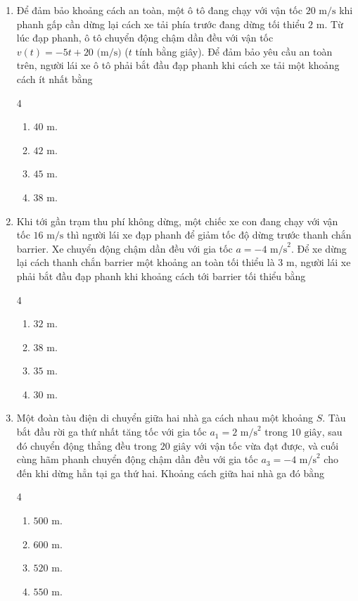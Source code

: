 \documentclass[12pt]{article}
\begin{document}
\begin{enumerate}[label=\textbf{Câu \arabic*.}]
		\item Để đảm bảo khoảng cách an toàn, một ô tô đang chạy với vận tốc $20\text{ m/s}$ khi phanh gấp cần dừng lại cách xe tải phía trước đang dừng tối thiểu $2\text{ m}$. Từ lúc đạp phanh, ô tô chuyển động chậm dần đều với vận tốc $v(t) = -5t + 20\text{ (m/s)}$ ($t$ tính bằng giây). Để đảm bảo yêu cầu an toàn trên, người lái xe ô tô phải bắt đầu đạp phanh khi cách xe tải một khoảng cách ít nhất bằng
		\begin{multicols}{4}
			\begin{enumerate}[label=\textbf{\Alph*.}]
				\item $40\text{ m}$.
				\item $42\text{ m}$.
				\item $45\text{ m}$.
				\item $38\text{ m}$.
			\end{enumerate}
		\end{multicols}
		
		\item Khi tới gần trạm thu phí không dừng, một chiếc xe con đang chạy với vận tốc $16\text{ m/s}$ thì người lái xe đạp phanh để giảm tốc độ dừng trước thanh chắn barrier. Xe chuyển động chậm dần đều với gia tốc $a = -4\text{ m/s}^2$. Để xe dừng lại cách thanh chắn barrier một khoảng an toàn tối thiểu là $3\text{ m}$, người lái xe phải bắt đầu đạp phanh khi khoảng cách tới barrier tối thiểu bằng
		\begin{multicols}{4}
			\begin{enumerate}[label=\textbf{\Alph*.}]
				\item $32\text{ m}$.
				\item $38\text{ m}$.
				\item $35\text{ m}$.
				\item $30\text{ m}$.
			\end{enumerate}
		\end{multicols}
		
		\item Một đoàn tàu điện di chuyển giữa hai nhà ga cách nhau một khoảng $S$. Tàu bắt đầu rời ga thứ nhất tăng tốc với gia tốc $a_1 = 2\text{ m/s}^2$ trong $10\text{ giây}$, sau đó chuyển động thẳng đều trong $20\text{ giây}$ với vận tốc vừa đạt được, và cuối cùng hãm phanh chuyển động chậm dần đều với gia tốc $a_3 = -4\text{ m/s}^2$ cho đến khi dừng hẳn tại ga thứ hai. Khoảng cách giữa hai nhà ga đó bằng
		\begin{multicols}{4}
			\begin{enumerate}[label=\textbf{\Alph*.}]
				\item $500\text{ m}$.
				\item $600\text{ m}$.
				\item $520\text{ m}$.
				\item $550\text{ m}$.
			\end{enumerate}
		\end{multicols}
		

\end{enumerate}
\end{document}
